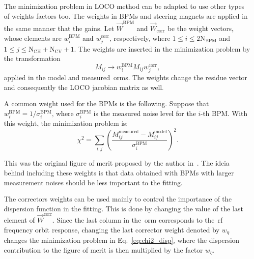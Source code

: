 The minimization problem in LOCO method can be adapted to use other types of weights factors too. The weights in BPMs and steering magnets are applied in the same manner that the gains. Let $\vec{W}^{\mathrm{BPM}}$ and $\vec{W}_{\mathrm{corr}}$ be the weight vectors, whose elements are $w^{\mathrm{BPM}}_{i}$ and $w^{\mathrm{corr}}_{j}$, respectively, where $1 \leq i \leq 2\mathrm{N}_{\mathrm{BPM}}$ and $1 \leq j \leq \mathrm{N}_{\mathrm{CH}} + \mathrm{N}_{\mathrm{CV}} + 1$. The weights are inserted in the minimization problem by the transformation
\begin{equation}
    M_{ij} \rightarrow w^{\mathrm{BPM}}_{i}M_{ij}w^{\mathrm{corr}}_{j}, 
\end{equation}
applied in the model and measured~\gls{orm}s. The weights change the residue vector and consequently the LOCO jacobian matrix as well. 



A common weight used for the BPMs is the following. Suppose that $w^{\mathrm{BPM}}_{i} = 1/\sigma^{\mathrm{BPM}}_{i}$, where $\sigma^{\mathrm{BPM}}_{i}$ is the measured noise level for the $i$-th BPM. With this weight, the minimization problem is:
\begin{equation}
    \chi^2 = \sum_{i, j} \left(\dfrac{M^{\mathrm{measured}}_{ij} - M^{\mathrm{model}}_{ij}}{\sigma^{\mathrm{BPM}}_{i}}\right)^2.
    \label{eq:chi2_original}
\end{equation}

This was the original figure of merit proposed by the author in~\cite{safranek1997}. The ideia behind including these weights is that data obtained with BPMs with larger measurement noises should be less important to the fitting.

The correctors weights can be used mainly to control the importance of the dispersion function in the fitting. This is done by changing the value of the last element of $\vec{W}^{\mathrm{corr}}$. Since the last column in the~\gls{orm} corresponds to the~\gls{rf} frequency orbit response, changing the last corrector weight denoted by $w_{\eta}$ changes the minimization problem in Eq.~\eqref{eq:chi2_disp}, where the dispersion contribution to the figure of merit is then multiplied by the factor $w_{\eta}$.

